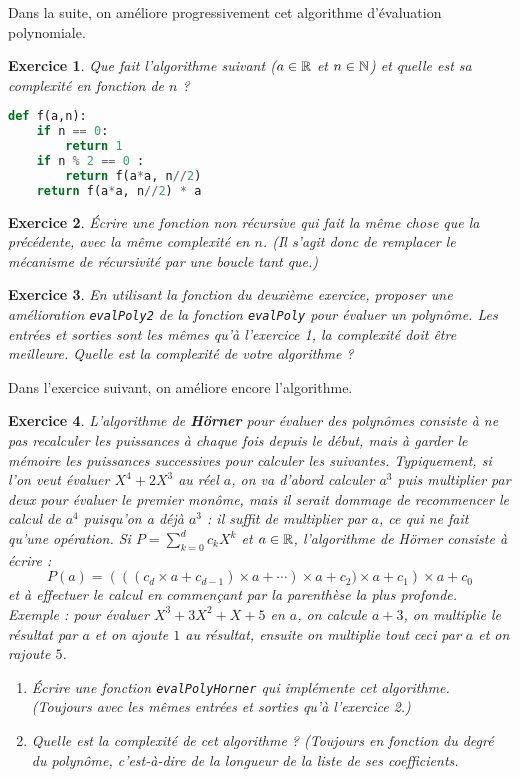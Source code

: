 \documentclass[11pt,a4paper]{article}
\newtheorem{ex}{Exercice}
\begin{document}
Dans la suite, on améliore progressivement cet algorithme d'évaluation polynomiale.

\begin{ex}
Que fait l'algorithme suivant ($a\in\mathbb{R}$ et $n\in\mathbb{N}$) et quelle est sa complexité en fonction de $n$ ? 
\begin{lstlisting}[language=Python]
def f(a,n):
	if n == 0:
		return 1
	if n % 2 == 0 :
		return f(a*a, n//2)
	return f(a*a, n//2) * a
\end{lstlisting}
\end{ex}

\begin{ex}
Écrire une fonction non récursive qui fait la même chose que la précédente, avec la même complexité en $n$. 
(Il s'agit donc de remplacer le mécanisme de récursivité par une boucle \og tant que\fg.)

\end{ex}

\begin{ex}
En utilisant la fonction du deuxième exercice, proposer une amélioration \verb+evalPoly2+ de la fonction \verb+evalPoly+ pour évaluer un polynôme.
Les entrées et sorties sont les mêmes qu'à l'exercice 1, la complexité doit être meilleure.
Quelle est la complexité de votre algorithme ?
\end{ex}

Dans l'exercice suivant, on améliore encore l'algorithme.

\begin{ex}
L'algorithme de \textbf{Hörner} pour évaluer des polynômes consiste à ne pas recalculer les puissances à chaque fois depuis le début, mais à garder le mémoire les puissances successives pour calculer les suivantes. 
Typiquement, si l'on veut évaluer $X^4+2X^3$ au réel $a$, on va d'abord calculer $a^3$ puis multiplier par deux pour évaluer le premier monôme, mais il serait dommage de recommencer le calcul de $a^4$ puisqu'on a déjà $a^3$ : il suffit de multiplier par $a$, ce qui ne fait qu'une opération.
Si $P = \sum_{k=0}^d c_kX^k$ et $a\in\mathbb{R}$, l'algorithme de Hörner consiste à écrire :
\[ P(a) = \left(((c_d\times a+c_{d-1})\times a +\cdots )\times a +c_2)\times a+c_1 \right)\times a+c_0\]
et à effectuer le calcul en commençant par la parenthèse la plus \og profonde\fg.
Exemple : pour évaluer $X^3+3X^2+X+5$ en $a$, on calcule $a+3$, on multiplie le résultat par $a$ et on ajoute $1$ au résultat, ensuite on multiplie tout ceci par $a$ et on rajoute $5$.

\begin{enumerate}
\item Écrire une fonction \verb+evalPolyHorner+ qui implémente cet algorithme. (Toujours avec les mêmes entrées et sorties qu'à l'exercice 2.)
\item Quelle est la complexité de cet algorithme ? (Toujours en fonction du degré du polynôme, c'est-à-dire de la longueur de la liste de ses coefficients.
\end{enumerate}

\end{ex}
\end{document}
